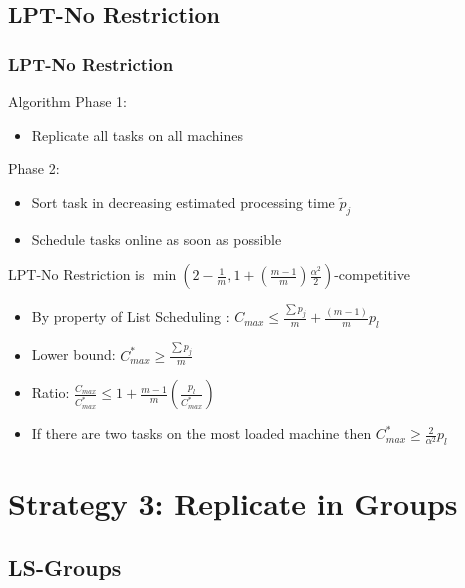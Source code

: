 \documentclass[usenames,dvipsnames]{beamer}
\begin{document}
\subsection{LPT-No Restriction}

\begin{frame}
  \frametitle{LPT-No Restriction}

  \begin{block}{Algorithm}
    Phase 1:
    \begin{itemize}
    \item Replicate all tasks on all machines
    \end{itemize}
    Phase 2:
    \begin{itemize}
    \item Sort task in decreasing estimated processing time $\tilde{p}_j$
    \item Schedule tasks online as soon as possible
    \end{itemize}
  \end{block}
  
  \pause

  \begin{block}{LPT-No Restriction is $\min(2-\frac{1}{m}, 1 + (\frac{m-1}{m}) \frac{\alpha^{2}}{2})$-competitive}
    \begin{itemize}
    \item By property of List Scheduling : $C_{max} \leq  \frac{\sum {p_j}}{m} + \frac{(m-1)}{m}p_l$
    \item Lower bound: $C_{max}^{*}\geq\frac{\sum p_j}{m}$
    \item Ratio: $\frac{C_{max}}{C_{max}^{*}} \leq 1 + {\frac{m-1}{m}}\left(\frac{p_l}{C_{max}^{*}}\right)$
    \item If there are two tasks on the most loaded machine then $C_{max}^* \geq {\frac{2}{\alpha^{2}}} p_l$
    \end{itemize}
  \end{block}  
\end{frame}

\section{Strategy 3: Replicate in Groups}

\subsection{LS-Groups}
\end{document}
